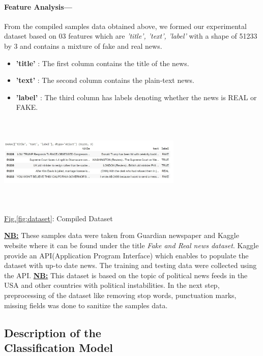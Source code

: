 \documentclass[11.5pt]{article}
\begin{document}
\begin{multicols}{2}
\paragraph{Feature Analysis---}
From the compiled samples data obtained above, we formed our experimental dataset based on 03 features which are \textit{'title', 'text', 'label'} with a shape of 51233 by 3 and contains a mixture of fake and real news.
\begin{itemize}
    \item \textbf{'title'} : The first column contains the title of the news.
    \item  \textbf{'text'} : The second column contains the plain-text news.
    \item \textbf{'label'} : The third column has labels denoting whether the news is REAL or FAKE.
\end{itemize}
\begin{center}
    \centering
    \includegraphics[width=8.8cm, height=4.4cm]{compiled dataset.jpg}
    \caption{\underline{Fig.\ref{fig:dataset}}: Compiled Dataset}
    \label{fig:dataset}
\end{center}
\underline{\textbf{NB:}} These samples data were taken from Guardian newspaper and Kaggle website where it can be found under the title \textit{Fake and Real news dataset}\cite{fakenewsdatasetkaggle}.
Kaggle provide an API(Application Program Interface) which enables to populate the dataset with up-to date news. The training and testing data were collected using the API.
\newline
\underline{\textbf{NB:}} This dataset is based on the topic of political news feeds in the USA and other countries with political instabilities.
\newline
In the next step, preprocessing of the dataset like removing stop words, punctuation marks, missing fields was done to sanitize the samples data.

\subsection{Description of the\\Classification Model}

\end{multicols}
\end{document}
